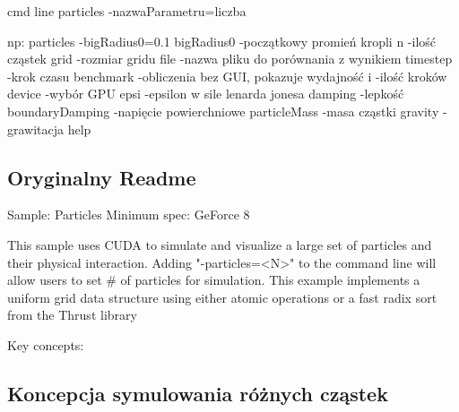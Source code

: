\begin{DoxyVerbInclude}
cmd line
particles -nazwaParametru=liczba

np:
particles -bigRadius0=0.1
bigRadius0 -początkowy promień kropli
n -ilość cząstek
grid -rozmiar gridu
file -nazwa pliku do porównania z wynikiem
timestep -krok czasu
benchmark -obliczenia bez GUI, pokazuje wydajność
i -ilość kroków
device -wybór GPU
epsi -epsilon w sile lenarda jonesa
damping -lepkość
boundaryDamping -napięcie powierchniowe
particleMass -masa cząstki
gravity -grawitacja
help
\end{DoxyVerbInclude}
 \hypertarget{index_oryginalny_readme}{}\subsection{Oryginalny Readme}\label{index_oryginalny_readme}

\begin{DoxyVerbInclude}
Sample: Particles
Minimum spec: GeForce 8

This sample uses CUDA to simulate and visualize a large set of particles and their physical interaction.  Adding "-particles=<N>" to the command line will allow users to set # of particles for simulation.  This example implements a uniform grid data structure using either atomic operations or a fast radix sort from the Thrust library

Key concepts:
\end{DoxyVerbInclude}
 \hypertarget{index_koncepcja_symulowania_roznych_czastek}{}\subsection{Koncepcja symulowania różnych cząstek}\label{index_koncepcja_symulowania_roznych_czastek}

